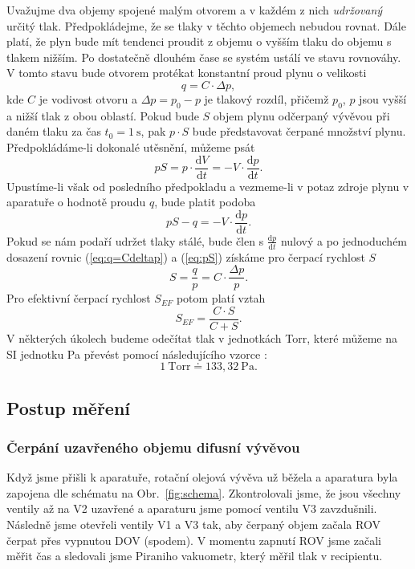 \documentclass[english]{article}
\newcommand{\unit}[1]{~\mathrm{#1}}
\newcommand{\dd}{\mathrm{d}}
\begin{document}
  	Uvažujme dva objemy spojené malým otvorem a v každém z nich \textit{udržovaný} určitý tlak. Předpokládejme, že se tlaky v těchto objemech nebudou rovnat. Dále platí, že plyn bude mít tendenci proudit z objemu o vyšším tlaku do objemu s tlakem nižším. Po dostatečně dlouhém čase se systém ustálí ve stavu rovnováhy. V tomto stavu bude otvorem protékat konstantní proud plynu o velikosti
  	\begin{equation}
  		q=C\cdot\Delta p,
	\label{eq:q=Cdeltap}
  	\end{equation}
  	kde $C$ je vodivost otvoru a $\Delta p=p_0-p$ je tlakový rozdíl, přičemž $p_0$, $p$ jsou vyšší a nižší tlak z obou oblastí. Pokud bude $S$ objem plynu odčerpaný vývěvou při daném tlaku za čas $t_0=1\unit{s}$, pak $p\cdot S$ bude představovat čerpané množství plynu. Předpokládáme-li dokonalé utěsnění, můžeme psát
  	\begin{equation}
  		pS=p\cdot\dfrac{\dd V}{\dd t}=-V\cdot\dfrac{\dd p}{\dd t}.
  	\label{eq:pSutesneni}
  	\end{equation}
  	Upustíme-li však od posledního předpokladu a vezmeme-li v potaz zdroje plynu v aparatuře o hodnotě proudu $q$, bude platit podoba
  	\begin{equation}
  		pS-q=-V\cdot\dfrac{\dd p}{\dd t}.
  	\label{eq:pS}
  	\end{equation}
  	Pokud se nám podaří udržet tlaky stálé, bude člen s $\frac{\dd p}{\dd t}$ nulový a po jednoduchém dosazení rovnic (\ref{eq:q=Cdeltap}) a (\ref{eq:pS}) získáme pro čerpací rychlost $S$
  	\begin{equation}
  		S=\dfrac{q}{p}=C\cdot \dfrac{\Delta p}{p}.
  	\label{eq:S}
  	\end{equation}
  	Pro efektivní čerpací rychlost $S_{EF}$ potom platí vztah
  	\begin{equation}
  		S_{EF}=\dfrac{C\cdot S}{C+S}.
  	\label{eq:Seff}
  	\end{equation}
  	V některých úkolech budeme odečítat tlak v jednotkách Torr, které můžeme na SI jednotku Pa převést pomocí následujícího vzorce \cite{bib:torr}:
  	\begin{equation}
  		1\unit{Torr} \doteq 133,32\unit{Pa}.
  	\label{eq:torr}
  	\end{equation}
  	
			
\subsection{Postup měření}
	\subsubsection{Čerpání uzavřeného objemu difusní vývěvou}
		Když jsme přišli k aparatuře, rotační olejová vývěva už běžela a aparatura byla zapojena dle schématu na Obr.~\ref{fig:schema}. Zkontrolovali jsme, že jsou všechny ventily až na V2 uzavřené a aparaturu jsme pomocí ventilu V3 zavzdušnili. Následně jsme otevřeli ventily V1 a V3 tak, aby čerpaný objem začala ROV čerpat přes vypnutou DOV (spodem). V momentu zapnutí ROV jsme začali měřit čas a sledovali jsme Piraniho vakuometr, který měřil tlak v recipientu. 
		
\end{document}
